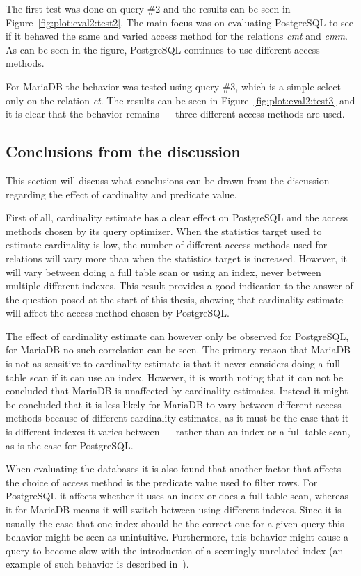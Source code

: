 The first test was done on query \#2 and the results can be seen in
Figure~\ref{fig:plot:eval2:test2}. The main focus was on evaluating PostgreSQL
to see if it behaved the same and varied access method for the relations
\textit{cmt} and \textit{cmm}. As can be seen in the figure, PostgreSQL
continues to use different access methods.

For MariaDB the behavior was tested using query \#3, which is a simple select
only on the relation \textit{ct}. The results can be seen in
Figure~\ref{fig:plot:eval2:test3} and it is clear that the behavior remains ---
three different access methods are used.

\subsection{Conclusions from the discussion}
This section will discuss what conclusions can be drawn from the discussion
regarding the effect of cardinality and predicate value.

First of all, cardinality estimate has a clear effect on PostgreSQL and the
access methods chosen by its query optimizer. When the statistics target used to
estimate cardinality is low, the number of different access methods used for
relations will vary more than when the statistics target is increased. However,
it will vary between doing a full table scan or using an index, never between
multiple different indexes. This result provides a good indication to the answer
of the question posed at the start of this thesis, showing that cardinality
estimate will affect the access method chosen by PostgreSQL.\@

The effect of cardinality estimate can however only be observed for PostgreSQL,
for MariaDB no such correlation can be seen. The primary reason that MariaDB is
not as sensitive to cardinality estimate is that it never considers doing a full
table scan if it can use an index. However, it is worth noting that it can not
be concluded that MariaDB is unaffected by cardinality estimates. Instead it
might be concluded that it is less likely for MariaDB to vary between different
access methods because of different cardinality estimates, as it must be the
case that it is different indexes it varies between --- rather than an index or
a full table scan, as is the case for PostgreSQL.\@

When evaluating the databases it is also found that another factor that affects
the choice of access method is the predicate value used to filter rows. For
PostgreSQL it affects whether it uses an index or does a full table scan,
whereas it for MariaDB means it will switch between using different indexes.
Since it is usually the case that one index should be the correct one for a
given query this behavior might be seen as unintuitive. Furthermore, this
behavior might cause a query to become slow with the introduction of a seemingly
unrelated index (an example of such behavior is described
in~\cite[Ch.~14]{lahdenmaki_2005_relational_rdidatodossea}).

